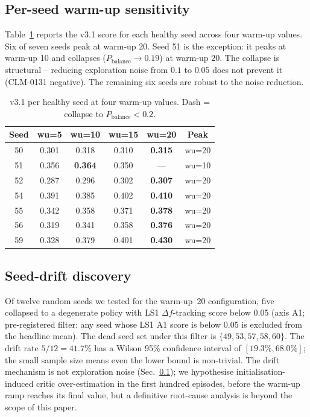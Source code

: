 \documentclass[journal,onecolumn,11pt]{IEEEtran}
\begin{document}
\subsection{Per-seed warm-up sensitivity}\label{sec:warmup}

Table~\ref{tab:warmup} reports the v3.1 score for each healthy seed
across four warm-up values. Six of seven seeds peak at warm-up 20.
Seed 51 is the exception: it peaks at warm-up 10 and collapses
($P_{\text{balance}} \to 0.19$) at warm-up 20. The collapse is
structural -- reducing exploration noise from $0.1$ to $0.05$ does
not prevent it (CLM-0131 negative). The remaining six seeds are
robust to the noise reduction.

\begin{table}[!t]
  \centering
  \caption{v3.1 per healthy seed at four warm-up values. Dash =
  collapse to $P_{\text{balance}} < 0.2$.}
  \label{tab:warmup}
  \begin{tabular}{cccccc}
    \toprule
    Seed & wu=5 & wu=10 & wu=15 & wu=20 & Peak \\
    \midrule
    50 & 0.301 & 0.318 & 0.310 & \textbf{0.315} & wu=20 \\
    51 & 0.356 & \textbf{0.364} & 0.350 & --- & wu=10 \\
    52 & 0.287 & 0.296 & 0.302 & \textbf{0.307} & wu=20 \\
    54 & 0.391 & 0.385 & 0.402 & \textbf{0.410} & wu=20 \\
    55 & 0.342 & 0.358 & 0.371 & \textbf{0.378} & wu=20 \\
    56 & 0.319 & 0.341 & 0.358 & \textbf{0.376} & wu=20 \\
    59 & 0.328 & 0.379 & 0.401 & \textbf{0.430} & wu=20 \\
    \bottomrule
  \end{tabular}
\end{table}

\subsection{Seed-drift discovery}\label{sec:drift}

Of twelve random seeds we tested for the warm-up~20 configuration,
five collapsed to a degenerate policy with LS1 $\Delta f$-tracking
score below 0.05 (axis A1; pre-registered filter: any seed whose
LS1 A1 score is below $0.05$ is excluded from the headline mean).
The dead seed set under this filter is $\{49, 53, 57, 58, 60\}$.
The drift rate $5/12 = 41.7\%$ has a Wilson 95\% confidence
interval of $[19.3\%, 68.0\%]$; the small sample size means even
the lower bound is non-trivial. The drift mechanism is not exploration
noise (Sec.~\ref{sec:warmup}); we hypothesise initialisation-induced
critic over-estimation in the first hundred episodes, before the
warm-up ramp reaches its final value, but a definitive root-cause
analysis is beyond the scope of this paper.
\end{document}
